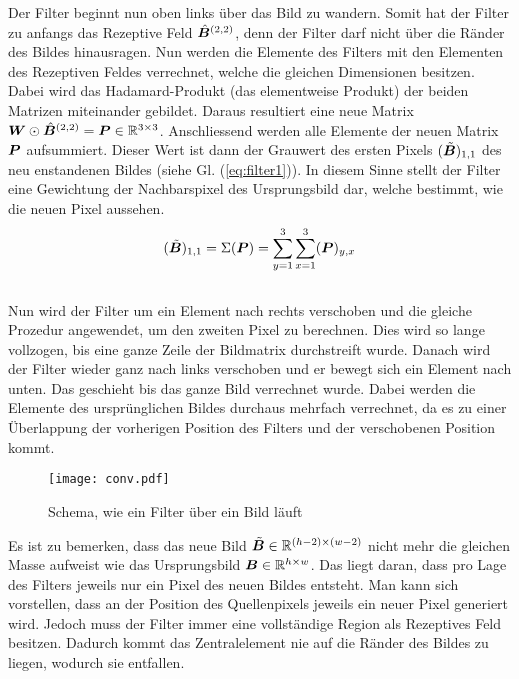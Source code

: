 \para{}
Der Filter beginnt nun oben links über das Bild zu wandern. Somit
hat der Filter zu anfangs das Rezeptive Feld $\hat{\bm{B}}^{(2,2)}$, denn der
Filter darf nicht über die Ränder des Bildes hinausragen.
Nun werden die Elemente des Filters mit den Elementen des Rezeptiven Feldes
verrechnet, welche die gleichen Dimensionen besitzen. Dabei wird das
Hadamard-Produkt (das elementweise Produkt) der beiden Matrizen miteinander
gebildet. Daraus resultiert eine neue Matrix $\bm{W} \odot
\hat{\bm{B}}^{(2,2)} = \bm{P} \in \mathbb{R}^{3 \times 3}$.
Anschliessend werden alle Elemente der neuen Matrix $\bm{P}$
aufsummiert. Dieser Wert ist dann der Grauwert des ersten Pixels
$(\tilde{\bm{B}})_{1,1}$ des neu enstandenen
Bildes (siehe Gl. (\ref{eq:filter1})). In diesem Sinne stellt der Filter eine
Gewichtung der Nachbarspixel des Ursprungsbild dar, welche
bestimmt, wie die neuen Pixel aussehen.
\\
\begin{equation}\label{eq:filter1}
  (\tilde{\bm{B}})_{1,1} = \Sigma(\bm{P}) = \sum_{y=1}^3 \sum_{x=1}^3 (\bm{P})_{y,x}
\end{equation}
\\
Nun wird der Filter um ein Element nach rechts verschoben und die gleiche
Prozedur angewendet, um den zweiten Pixel zu berechnen. Dies
wird so lange vollzogen, bis eine ganze Zeile der Bildmatrix durchstreift wurde.
Danach wird der Filter wieder ganz nach links verschoben und er bewegt sich ein
Element nach unten. Das geschieht bis das ganze Bild verrechnet wurde.
Dabei werden die Elemente des ursprünglichen Bildes durchaus mehrfach
verrechnet, da es zu einer Überlappung der vorherigen Position des Filters und
der verschobenen Position kommt.
\para{}
\begin{figure}[h!]
  \centering
  \texttt{[image: conv.pdf]}
  \caption{Schema, wie ein Filter über ein Bild läuft}
\end{figure}
\para{}
Es ist zu bemerken, dass das neue Bild $\tilde{\bm{B}} \in \mathbb{R}^{(h-2) \times (w-2)}$ nicht mehr die gleichen Masse
aufweist wie das Ursprungsbild $\bm{B} \in \mathbb{R}^{h \times w}$. Das liegt daran, dass pro
Lage des Filters jeweils nur ein Pixel des neuen Bildes entsteht. Man kann
sich vorstellen, dass an der Position des Quellenpixels jeweils ein neuer
Pixel generiert wird. Jedoch muss der Filter immer eine vollständige Region als
Rezeptives Feld besitzen. Dadurch kommt das Zentralelement nie auf die Ränder des
Bildes zu liegen, wodurch sie entfallen.
\para{}
\cite{deeplearning.ai:cnn}
\cite{wiki:convolution}

